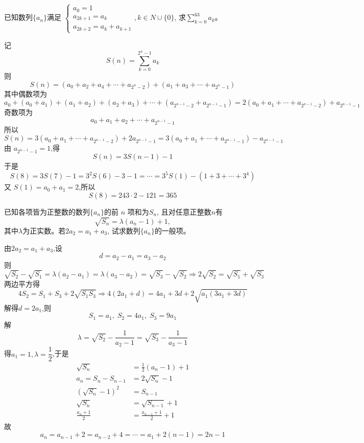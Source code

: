 \begin{questions}
    \question 已知数列$\{a_n\}$满足 $\begin{cases} a_0 = 1 \\ a_{2k+1} = a_k \\ a_{2k+2} = a_k + a_{k+1} \end{cases}, k \in N \cup \{0\}$, 求$\displaystyle \sum_{k=0}^{63} a_k$。
    \begin{solution}
        记
        \[
        S(n)=\sum_{k=0}^{2^n-1}a_k
        \]
        则
        \[
        S(n)=(a_0+a_2+a_4+\cdots+a_{2^n-2})+(a_1+a_3+\cdots+a_{2^n-1})
        \]
        其中偶数项为
        \[
        a_0+(a_0+a_1)+(a_1+a_2)+(a_2+a_3)+\cdots+(a_{2^{n-1}-2}+a_{2^{n-1}-1})
        =2(a_0+a_1+\cdots+a_{2^{n-1}-2})+a_{2^{n-1}-1}
        \]
        奇数项为
        \[
        a_0+a_1+a_2+\cdots+a_{2^{n-1}-1}
        \]
        所以
        \[
        S(n)=3(a_0+a_1+\cdots+a_{2^{n-1}-2})+2a_{2^{n-1}-1}
        =3(a_0+a_1+\cdots+a_{2^{n-1}-1})-a_{2^{n-1}-1}
        \]
        由 $a_{2^{n-1}-1}=1$,得
        \[
        S(n)=3S(n-1)-1
        \]
        于是
        \[
        S(8)=3S(7)-1=3^2S(6)-3-1=\cdots
        =3^5S(1)-(1+3+\cdots+3^4)
        \]
        又 $S(1)=a_0+a_1=2$,所以
        \[
        S(8)=243\cdot 2-121=365
        \]
    \end{solution}

    \question 已知各项皆为正整数的数列$\{ a_n \}$的前 $n$ 项和为$S_n$, 且对任意正整数$n$有
    \[
    \sqrt{S_n} = \lambda(a_n-1)+1,
    \]
    其中$\lambda$为正实数。若$2a_2=a_1+a_3$, 试求数列$\{a_n\}$的一般项。
    \begin{solution}
        由$2a_2=a_1+a_3$,设
        \[
        d=a_2-a_1=a_3-a_2
        \]
        则
        \[
        \sqrt{S_2}-\sqrt{S_1}=\lambda(a_2-a_1)=\lambda(a_3-a_2)=\sqrt{S_3}-\sqrt{S_2} \Rightarrow 2\sqrt{S_2}=\sqrt{S_1}+\sqrt{S_3}
        \]
        两边平方得
        \[
        4S_2=S_1+S_3+2\sqrt{S_1S_3} \Rightarrow 4(2a_1+d)=4a_1+3d+2\sqrt{a_1(3a_1+3d)}
        \]
        解得$d=2a_1$,则
        \[
        S_1=a_1,\; S_2=4a_1,\; S_3=9a_1
        \]
        解
        \[
        \lambda={\sqrt{S_2}-\frac{1}{ a_2-1}}
        ={\sqrt{S_3}-\frac{1}{a_3-1}}
        \]
        得$a_1=1,\lambda=\dfrac12$,于是
        \begin{align*}
        \sqrt{S_n}&=\frac12(a_n-1)+1 \\[1mm]
        a_n=S_n-S_{n-1}&=2\sqrt{S_n}-1 \\
        (\sqrt{S_n}-1)^2&=S_{n-1} \\
        \sqrt{S_n}&=\sqrt{S_{n-1}}+1 \\[1mm]
        \frac{a_n+1}{2}&=\frac{a_{n-1}+1}{2}+1
        \end{align*}
        故
        \[
        a_n=a_{n-1}+2=a_{n-2}+4=\cdots=a_1+2(n-1)=2n-1
        \]
    \end{solution}


\end{questions}
